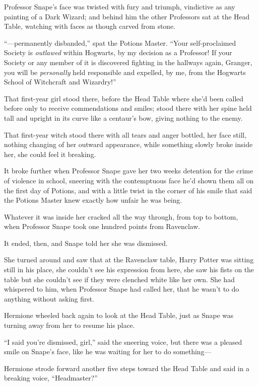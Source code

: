 Professor Snape’s face was twisted with fury and triumph, vindictive as any painting of a Dark Wizard; and behind him the other Professors sat at the Head Table, watching with faces as though carved from stone.

“—permanently disbanded,” spat the Potions Master.
“Your self-proclaimed Society is \emph{outlawed} within Hogwarts, by my decision as a Professor! If your Society or any member of it is discovered fighting in the hallways again, Granger, you will be \emph{personally} held responsible and expelled, by me, from the Hogwarts School of Witchcraft and Wizardry!”

That first-year girl stood there, before the Head Table where she’d been called before only to receive commendations and smiles; stood there with her spine held tall and upright in its curve like a centaur’s bow, giving nothing to the enemy.

That first-year witch stood there with all tears and anger bottled, her face still, nothing changing of her outward appearance, while something slowly broke inside her, she could feel it breaking.

It broke further when Professor Snape gave her two weeks detention for the crime of violence in school, sneering with the contemptuous face he’d shown them all on the first day of Potions, and with a little twist in the corner of his smile that said the Potions Master knew exactly how unfair he was being.

Whatever it was inside her cracked all the way through, from top to bottom, when Professor Snape took one hundred points from Ravenclaw.

It ended, then, and Snape told her she was dismissed.

She turned around and saw that at the Ravenclaw table, Harry Potter was sitting still in his place, she couldn’t see his expression from here, she saw his fists on the table but she couldn’t see if they were clenched white like her own. She had whispered to him, when Professor Snape had called her, that he wasn’t to do anything without asking first.

Hermione wheeled back again to look at the Head Table, just as Snape was turning away from her to resume his place.

“I said you’re dismissed, girl,” said the sneering voice, but there was a pleased smile on Snape’s face, like he was waiting for her to do something—

Hermione strode forward another five steps toward the Head Table and said in a breaking voice,
“Headmaster?”

